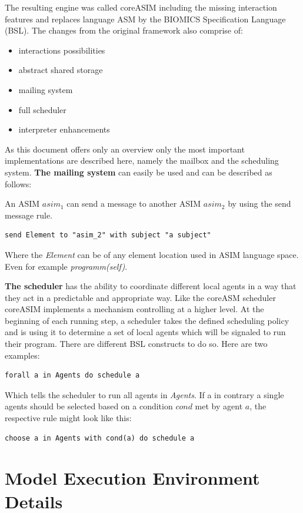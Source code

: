 The resulting engine was called coreASIM including the missing interaction features \cite{BIOMICSD42}\cite{BIOMICSD52} and replaces language ASM by the BIOMICS Specification Language (BSL). The changes from the original framework also comprise of:

\begin{itemize}
	\item interactions possibilities
	\item abstract shared storage
	\item mailing system
	\item full scheduler
	\item interpreter enhancements
\end{itemize}

As this document offers only an overview only the most important implementations are described here, namely the mailbox and the scheduling system. \textbf{The mailing system} can easily be used and can be described as follows:

\begin{minipage}{1.0\textwidth}
An ASIM $asim_1$ can send a message to another ASIM $asim_2$ by using the send message rule.\nopagebreak
\begin{lstlisting}[language=bsl]
	send Element to "asim_2" with subject "a subject"
\end{lstlisting}

Where the \textit{Element} can be of any element location used in ASIM language space. Even for example \textit{programm(self)}.
\end{minipage}

\textbf{The scheduler} has the ability to coordinate different local agents in a way that they act in a predictable and appropriate way. Like the coreASM scheduler coreASIM implements a mechanism controlling at a higher level. At the beginning of each running step, a scheduler takes the defined scheduling policy and is using it to determine a set of local agents which will be signaled to run their program. There are different BSL constructs to do so. Here are two examples:

\begin{lstlisting}[language=bsl]
	forall a in Agents do schedule a
\end{lstlisting}

Which tells the scheduler to run all agents in \textit{Agents}. If a in contrary a single agents should be selected based on a condition $cond$ met by agent $a$, the respective rule might look like this:

\begin{lstlisting}[language=bsl]
	choose a in Agents with cond(a) do schedule a
\end{lstlisting}


\section{Model Execution Environment Details}
\label{sec:exec-env-model-details}

